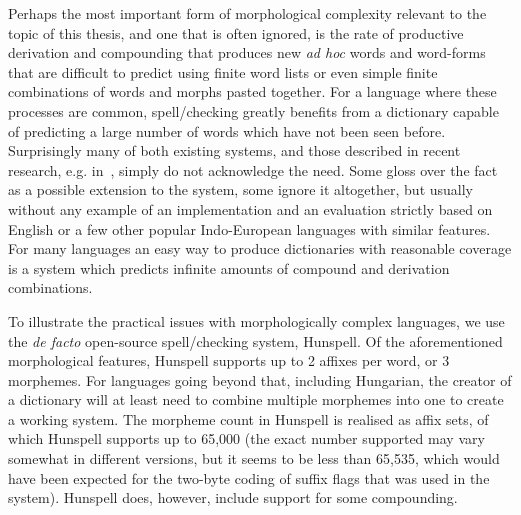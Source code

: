 \documentclass[officiallayout,final]{unihelcompling}
\begin{document}
Perhaps the most important form of morphological complexity relevant to the
topic of this thesis, and one that is often ignored, is the rate of productive
derivation and compounding that produces new \emph{ad hoc} words and word-forms
that are difficult to predict using finite word lists or even simple finite
combinations of words and morphs pasted together.  For a language where these
processes are common, spell\-/checking greatly benefits from a dictionary
capable of predicting a large number of words which have not been seen before.
Surprisingly many of both existing systems, and those described in recent
research, e.g.  in~\cite{hassan2008language,watson2003new}, simply do not
acknowledge the need.  Some gloss over the fact as a possible extension to the
system, some ignore it altogether, but usually without any example of an
implementation and an evaluation strictly based on English or a few other
popular Indo-European languages with similar features. For many languages an
easy way to produce dictionaries with reasonable coverage is a system which
predicts infinite amounts of compound and derivation combinations.

To illustrate the practical issues with morphologically complex languages, we
use the \emph{de facto} open-source spell\-/checking system, Hunspell. Of the
aforementioned morphological features, Hunspell supports up to 2 affixes per
word, or 3 morphemes. For languages going beyond that, including Hungarian, the
creator of a dictionary will at least need to combine multiple morphemes into
one to create a working system. The morpheme count in Hunspell is realised as
affix sets, of which Hunspell supports up to 65,000 (the exact number supported
may vary somewhat in different versions, but it seems to be less than 65,535,
which would have been expected for the two-byte coding of suffix flags that was
used in the system). Hunspell does, however, include support for some
compounding.
\end{document}
